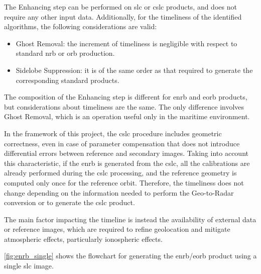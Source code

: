 The Enhancing step can be performed on \acs{slc} or \acs{cslc} products, and does not require any other input data. Additionally, for the timeliness of the identified algorithms, the following considerations are valid:
\begin{itemize}
    \item Ghost Removal: the increment of timeliness is negligible with respect to standard \acs{nrb} or \acs{orb} production.
    \item Sidelobe Suppression: it is of the same order as that required to generate the corresponding standard products. 
\end{itemize}
The composition of the Enhancing step is different for \acs{enrb} and \acs{eorb} products, but considerations about timeliness are the same. The only difference involves Ghost Removal, which is an operation useful only in the maritime environment.

In the framework of this project, the \acs{cslc} procedure includes geometric correctness, even in case of parameter compensation that does not introduce differential errors between reference and secondary images. Taking into account this characteristic, if the \acs{enrb} is generated from the \acs{cslc}, all the calibrations are already performed during the \acs{cslc} processing, and the reference geometry is computed only once for the reference orbit. Therefore, the timeliness does not change depending on the information needed to perform the Geo-to-Radar conversion or to generate the \acs{cslc} product.

The main factor impacting the timeline is instead the availability of external data or reference images, which are required to refine geolocation and mitigate atmospheric effects, particularly ionospheric effects. 

\autoref{fig:enrb_single} shows the flowchart for generating the \acs{enrb}/\acs{eorb} product using a single \acs{slc} image.

